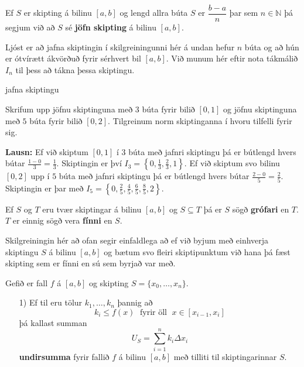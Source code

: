 \begin{skilgr}{}
Ef $S$ er skipting á bilinu $[a,b]$ og lengd allra búta $S$ er $\dfrac{b-a}{n}$ þar sem $n \in \mathbb{N}$ þá segjum við að $S$ sé \textbf{jöfn skipting} á bilinu $[a,b]$.
\end{skilgr}

\newpage

\begin{ath}
Ljóst er að jafna skiptingin í skilgreiningunni hér á undan hefur $n$ búta og að hún er ótvírætt ákvörðuð fyrir sérhvert bil $[a,b]$. Við munum hér eftir nota tákmálið $I_n$ til þess að tákna þessa skiptingu.
\end{ath}

\begin{syn}{jafna skiptingu}

Skrifum upp jöfnu skiptinguna með $3$ búta fyrir bilið $[0,1]$ og jöfnu skiptinguna með $5$ búta fyrir bilið $[0,2]$. Tilgreinum norm skiptinganna í hvoru tilfelli fyrir sig.

\vspace{2mm}

{\bf Lausn:} Ef við skiptum $[0,1]$ í $3$ búta með jafnri skiptingu þá er bútlengd hvers bútar $\frac{1-0}{3} = \frac{1}{3}$. Skiptingin er því $I_{3} = \left\{0,\frac{1}{3},\frac{2}{3},1\right\}$. Ef við skiptum svo bilinu $[0,2]$ upp í $5$ búta með jafnri skiptingu þá er bútlengd hvers bútar $\frac{2-0}{5} = \frac{2}{5}$. Skiptingin er þar með $I_{5} = \left\{0,\frac{2}{5},\frac{4}{5},\frac{6}{5},\frac{8}{5},2\right\}$.

\end{syn}

\begin{skilgr}{}
Ef $S$ og $T$ eru tvær skiptingar á bilinu $[a,b]$ og $S \subseteq T$ þá er $S$ sögð \textbf{grófari} en $T$. $T$ er einnig sögð vera \textbf{fínni} en $S$.
\end{skilgr}

\begin{ath}
Skilgreiningin hér að ofan segir einfaldlega að ef við byjum með einhverja skiptingu $S$ á bilinu $[a,b]$ og bætum svo fleiri skiptipunktum við hana þá fæst skipting sem er fínni en sú sem byrjað var með.
\end{ath}

\begin{skilgr}{}
Gefið er fall $f$ á $[a,b]$ og skipting $S = \{x_{0},\ldots,x_{n}\}$. 
\begin{itemize}

\item[1)] Ef til eru tölur $k_{1},\ldots,k_{n}$ þannig að
$$
k_{i} \leq f(x) \; \text{ fyrir öll } \; x \in [x_{i-1},x_{i}]
$$
þá kallast summan
$$
U_{S} = \sum_{i = 1}^{n} k_{i}\Delta x_{i}
$$
\textbf{undirsumma} fyrir fallið $f$ á bilinu $[a,b]$ með tilliti til skiptingarinnar $S$.

\end{itemize}
\end{skilgr}

